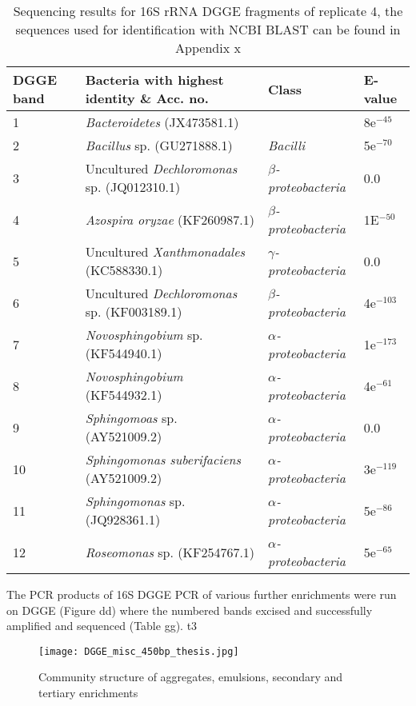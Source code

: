 \documentclass{article}
\begin{document}
\begin{table}
\begin{tabular}{ | l | p{7.8cm} | p{3cm} | l | }
\hline
DGGE band & Bacteria with highest identity \& Acc. no. & Class & E-value \\
\hline
1   &  \emph{Bacteroidetes} (JX473581.1) &  & 8e$^{-45}$ \\
\hline
2  & \emph{Bacillus} sp. (GU271888.1) & \emph{Bacilli} & 5e$^{-70}$ \\
\hline
3 & Uncultured \emph{Dechloromonas} sp. (JQ012310.1) & \emph{$\beta$-proteobacteria} & 0.0 \\
\hline
4 & \emph{Azospira oryzae} (KF260987.1) & \emph{$\beta$-proteobacteria} & 1E$^{-50}$ \\
\hline
5 & Uncultured \emph{Xanthmonadales} (KC588330.1) & \emph{$\gamma$-proteobacteria} & 0.0 \\
\hline
6 & Uncultured \emph{Dechloromonas} sp. (KF003189.1) & \emph{$\beta$-proteobacteria} & 4e$^{-103}$ \\
\hline
7 & \emph{Novosphingobium} sp. (KF544940.1) & \emph{$\alpha$-proteobacteria} & 1e$^{-173}$ \\
\hline
8 & \emph{Novosphingobium} (KF544932.1) & \emph{$\alpha$-proteobacteria} & 4e$^{-61}$ \\
\hline
9 & \emph{Sphingomoas} sp. (AY521009.2) & \emph{$\alpha$-proteobacteria} & 0.0 \\
\hline
10 & \emph{Sphingomonas suberifaciens} (AY521009.2) & \emph{$\alpha$-proteobacteria} & 3e$^{-119}$ \\
\hline
11 & \emph{Sphingomonas} sp. (JQ928361.1) & \emph{$\alpha$-proteobacteria} & 5e$^{-86}$ \\
\hline
12 & \emph{Roseomonas} sp.  (KF254767.1) & \emph{$\alpha$-proteobacteria} & 5e$^{-65}$ \\
\hline
\end{tabular}
\caption{Sequencing results for 16S rRNA DGGE fragments of replicate 4, the sequences used for identification with NCBI BLAST can be found in Appendix x}
\end{table}

The PCR products of 16S DGGE PCR  of various further enrichments were run on DGGE (Figure dd) where the numbered bands excised and successfully amplified and sequenced (Table gg). t3 

\begin{figure}
\texttt{[image: DGGE\_misc\_450bp\_thesis.jpg]}
\caption{Community structure of aggregates, emulsions, secondary and tertiary enrichments}
\end{figure}
\end{document}
